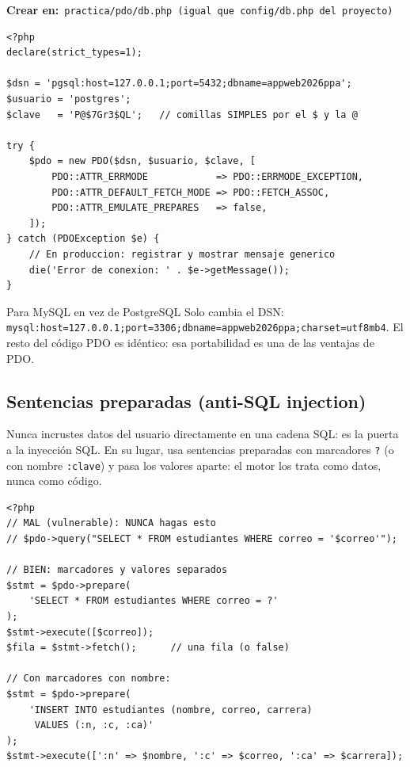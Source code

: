 \documentclass[11pt]{article}
\begin{document}
{\small\color{phpazulo}\textbf{Crear en:}~}\texttt{practica/\allowbreak{}pdo/\allowbreak{}db.\allowbreak{}php  (igual que config/\allowbreak{}db.\allowbreak{}php del proyecto)}\par\nobreak\vspace{-1pt}
\begin{cajacodigo}
\begin{lstlisting}[style=php]
<?php
declare(strict_types=1);

$dsn = 'pgsql:host=127.0.0.1;port=5432;dbname=appweb2026ppa';
$usuario = 'postgres';
$clave   = 'P@$7Gr3$QL';   // comillas SIMPLES por el $ y la @

try {
    $pdo = new PDO($dsn, $usuario, $clave, [
        PDO::ATTR_ERRMODE            => PDO::ERRMODE_EXCEPTION,
        PDO::ATTR_DEFAULT_FETCH_MODE => PDO::FETCH_ASSOC,
        PDO::ATTR_EMULATE_PREPARES   => false,
    ]);
} catch (PDOException $e) {
    // En produccion: registrar y mostrar mensaje generico
    die('Error de conexion: ' . $e->getMessage());
}
\end{lstlisting}
\end{cajacodigo}
\vspace{2pt}
\begin{cajatip}{Para MySQL en vez de PostgreSQL}
Solo cambia el DSN: \texttt{mysql:\allowbreak{}host=\allowbreak{}127.\allowbreak{}0.\allowbreak{}0.\allowbreak{}1;\allowbreak{}port=\allowbreak{}3306;\allowbreak{}dbname=\allowbreak{}appweb2026ppa;\allowbreak{}charset=\allowbreak{}utf8mb4}. El resto del código PDO es idéntico: esa portabilidad es una de las ventajas de PDO.\par
\end{cajatip}
\subsection{Sentencias preparadas (anti-SQL injection)}
Nunca incrustes datos del usuario directamente en una cadena SQL: es la puerta a la inyección SQL. En su lugar, usa sentencias preparadas con marcadores \texttt{?\allowbreak{}} (o con nombre \texttt{:\allowbreak{}clave}) y pasa los valores aparte: el motor los trata como datos, nunca como código.

\begin{cajacodigo}
\begin{lstlisting}[style=php]
<?php
// MAL (vulnerable): NUNCA hagas esto
// $pdo->query("SELECT * FROM estudiantes WHERE correo = '$correo'");

// BIEN: marcadores y valores separados
$stmt = $pdo->prepare(
    'SELECT * FROM estudiantes WHERE correo = ?'
);
$stmt->execute([$correo]);
$fila = $stmt->fetch();      // una fila (o false)

// Con marcadores con nombre:
$stmt = $pdo->prepare(
    'INSERT INTO estudiantes (nombre, correo, carrera)
     VALUES (:n, :c, :ca)'
);
$stmt->execute([':n' => $nombre, ':c' => $correo, ':ca' => $carrera]);
\end{lstlisting}
\end{cajacodigo}
\vspace{2pt}
\end{document}
